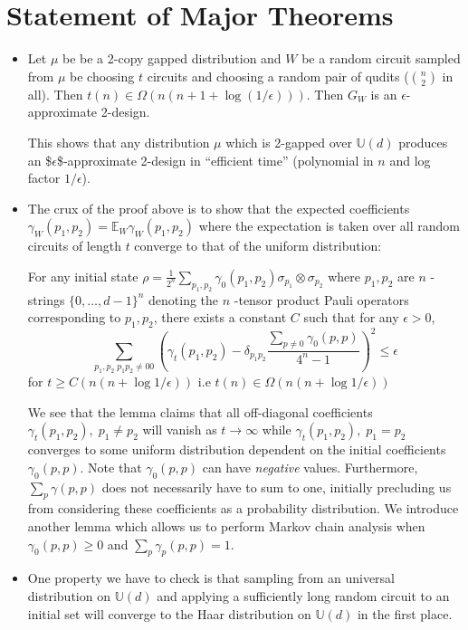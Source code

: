 \documentclass[a4paper]{article}
\begin{document}
\section{Statement of Major Theorems}
\label{sec:org99a91a4}
\begin{itemize}
\item Let \(\mu\) be be a 2-copy gapped distribution and \(W\) be a random circuit sampled from \(\mu\) be choosing \(t\) circuits and choosing a random pair of qudits (\({n \choose 2}\) in all). Then \(t(n) \in \Omega(n(n+1 + \log(1/\epsilon)))\). Then \(G_W\) is an \(\epsilon\)-approximate 2-design.

This shows that any distribution \(\mu\) which is 2-gapped over \(\mathbb{U}(d)\) produces an \$\(\epsilon\)\$-approximate 2-design in ``efficient time'' (polynomial in \(n\) and log factor \(1/\epsilon\)).

\item The crux of the proof above is to show that the expected coefficients  \(\gamma_W(p_1,p_2) = \mathbb{E}_W \gamma_W(p_1,p_2)\) where the expectation is taken over all random circuits of length \(t\) converge to that of the uniform distribution:

For any initial state \(\rho = \frac{1}{2^n} \sum_{p_1, p_2} \gamma_0(p_1, p_2) \sigma_{p_1}\otimes \sigma_{p_2}\) where \(p_1,p_2\) are \(n\) -strings \(\{0,\dots,d-1\}^n\) denoting the \(n\) -tensor product Pauli operators corresponding to
\(p_1,p_2\), there exists a constant \(C\) such that for any \(\epsilon > 0\),
$$ \sum_{p_1,p_2 \; p_1p_2 \neq 00} \left( \gamma_t(p_1,p_2) - \delta_{p_1p_2}\frac{\sum_{p \neq 0} \gamma_0(p,p)}{4^n-1} \right)^2 \leq \epsilon$$
for \(t \geq C(n(n+ \log{1/\epsilon}))\) i.e \(t(n) \in \Omega(n(n+ \log{1/\epsilon}))\)

We see that the lemma claims that all off-diagonal coefficients \(\gamma_t(p_1,p_2), \; p_1\neq p_2\) will vanish as \(t \rightarrow \infty\) while \(\gamma_t(p_1,p_2), \; p_1 = p_2\) converges to some uniform distribution dependent on the initial coefficients \(\gamma_0(p,p)\). Note that \(\gamma_0(p,p)\) can have \emph{negative} values. Furthermore, \(\sum_p \gamma(p,p)\) does not necessarily have to sum to one, initially precluding us from considering these coefficients as a probability distribution. We introduce another lemma which allows us to perform Markov chain analysis when \(\gamma_0(p,p) \geq 0\) and \(\sum_p \gamma_p(p,p) = 1\).

\item One property we have to check is that sampling from an universal distribution on \(\mathbb{U}(d)\) and applying a sufficiently long random circuit to an initial set will converge to the Haar distribution on \(\mathbb{U}(d)\) in the first place.


\end{itemize}
\end{document}
